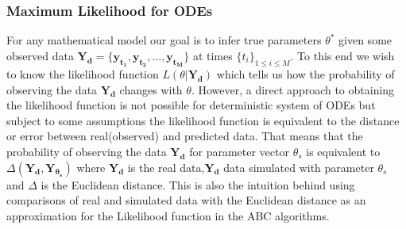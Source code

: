 \documentclass[12pt,a4paper,titlepage]{article}
\begin{document}
\subsubsection{Maximum Likelihood for ODEs}
\label{sec:likelihood}
For any mathematical model our goal is to infer true parameters $\theta^*$ given some observed data $\mathbf{Y_{d}} =\{\mathbf{y_{t_1}}, \mathbf{y_{t_2}}, \dots, \mathbf{y_{t_M}}\}$ at times $\{t_{i}\}_{1 \le i \le M}$. To this end we wish to know the likelihood function $L(\theta | \mathbf{Y_{d}})$ which tells us how the probability of observing the data $\mathbf{Y_{d}}$ changes with $\theta$. However, a direct approach to obtaining the likelihood function is not possible for deterministic system of ODEs but subject to some assumptions the likelihood function is equivalent to the distance or error between real(observed) and predicted data. That means that the probability of observing the data $\mathbf{Y_{d}}$ for parameter vector $\theta_{s}$ is equivalent to $\Delta(\mathbf{Y_{d}}, \mathbf{Y_{\theta_s}})$ where $\mathbf{Y_{d}}$ is the real data,$\mathbf{Y_{d}}$ data simulated with parameter $\theta_{s}$ and $\Delta$ is the Euclidean distance. This is also the intuition behind using comparisons of real and simulated data with the Euclidean distance as an approximation for the Likelihood function in the ABC algorithms. 
\end{document}
